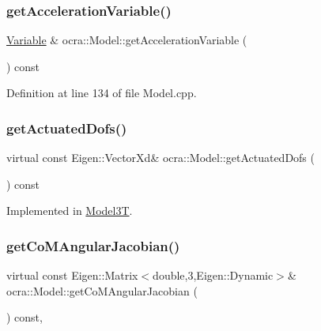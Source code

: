 \subsubsection{\texorpdfstring{get\+Acceleration\+Variable()}{getAccelerationVariable()}}
{\footnotesize\ttfamily \hyperlink{classocra_1_1Variable}{Variable} \& ocra\+::\+Model\+::get\+Acceleration\+Variable (\begin{DoxyParamCaption}{ }\end{DoxyParamCaption}) const}



Definition at line 134 of file Model.\+cpp.

\hypertarget{classocra_1_1Model_ad1a78d57aca4a4128c54d479f30afd82}{}\label{classocra_1_1Model_ad1a78d57aca4a4128c54d479f30afd82} 
\subsubsection{\texorpdfstring{get\+Actuated\+Dofs()}{getActuatedDofs()}}
{\footnotesize\ttfamily virtual const Eigen\+::\+Vector\+Xd\& ocra\+::\+Model\+::get\+Actuated\+Dofs (\begin{DoxyParamCaption}{ }\end{DoxyParamCaption}) const\hspace{0.3cm}{\ttfamily [pure virtual]}}



Implemented in \hyperlink{classModel3T_aad7041820bf886ee965b05611bdedfd0}{Model3T}.

\hypertarget{classocra_1_1Model_a24406cb7507684963e5aedb6b79940cd}{}\label{classocra_1_1Model_a24406cb7507684963e5aedb6b79940cd} 
\subsubsection{\texorpdfstring{get\+Co\+M\+Angular\+Jacobian()}{getCoMAngularJacobian()}}
{\footnotesize\ttfamily virtual const Eigen\+::\+Matrix$<$double,3,Eigen\+::\+Dynamic$>$\& ocra\+::\+Model\+::get\+Co\+M\+Angular\+Jacobian (\begin{DoxyParamCaption}{ }\end{DoxyParamCaption}) const\hspace{0.3cm}{\ttfamily [inline]}, {\ttfamily [virtual]}}




